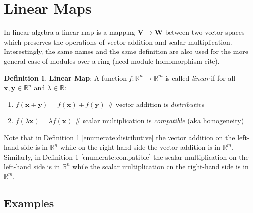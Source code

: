 \documentclass{article}
\theoremstyle{definition}
\newtheorem{definition}{Definition}[section]
\begin{document}
\section{Linear Maps}
\label{sec:linear_maps}
In linear algebra a linear map is a mapping $\mathbf{V}\to
\mathbf{W}$ between two vector spaces which preserves the
operations of vector addition and scalar
multiplication. Interestingly, the same names and the same
definition are also used for the more general case of modules
over a ring (need module homomorphism cite).
%
%
%
\begin{definition}
\label{def:linear_map}
{\bf Linear Map}: A function $f:\mathbb{R}^{n} \rightarrow
\mathbb{R}^{m}$ is called \emph{linear} if for all
$\mathbf{x},\mathbf{y} \in \mathbb{R}^{n}$ and $\lambda \in
\mathbb{R}$:

\begin{enumerate}[label=(\alph*)]
\item $f(\mathbf{x}+\mathbf{y}) = f(\mathbf{x})+f(\mathbf{y})$		
		\hspace{3.50em} \# vector addition is \emph{distributive}
\label{enumerate:distributive}

\item $f(\lambda \mathbf{x}) = \lambda f(\mathbf{x})$				
		\hspace{7.30em} \# scalar multiplication is
                \emph{compatible} (aka homogeneity) 
\label{enumerate:compatible}
\end{enumerate}


\noindent
Note that in Definition \ref{def:linear_map}
\ref{enumerate:distributive} the vector addition on the left-hand
side is in $\mathbb{R}^{n}$ while on the right-hand side the
vector addition is in $\mathbb{R}^{m}$. Similarly, in Definition
\ref{def:linear_map} \ref{enumerate:compatible} the scalar
multiplication on the left-hand side is in $\mathbb{R}^{n}$ while
the scalar multiplication on the right-hand side is in
$\mathbb{R}^{m}$.
\end{definition}

\subsection{Examples}
\end{document}
